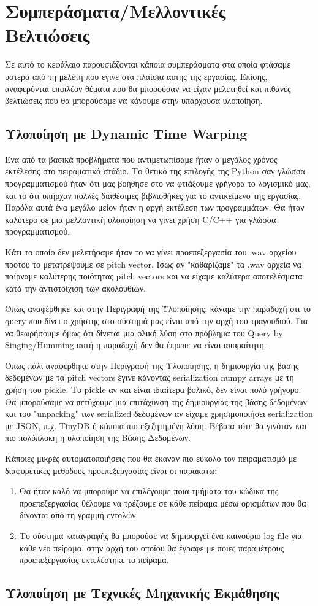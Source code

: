 \section{Συμπεράσματα/Μελλοντικές Βελτιώσεις}
Σε αυτό το κεφάλαιο παρουσιάζονται κάποια συμπεράσματα στα οποία φτάσαμε ύστερα από τη μελέτη που έγινε στα
πλαίσια αυτής της εργασίας. Επίσης, αναφερόνται επιπλέον θέματα που θα μπορούσαν να είχαν μελετηθεί 
και πιθανές βελτιώσεις που θα μπορούσαμε να κάνουμε στην υπάρχουσα υλοποίηση.

\subsection{Υλοποίηση με Dynamic Time Warping}
Ένα από τα βασικά προβλήματα που αντιμετωπίσαμε ήταν ο μεγάλος χρόνος εκτέλεσης στο πειραματικό στάδιο. Το θετικό της επιλογής της Python σαν γλώσσα προγραμματισμού ήταν ότι μας βοήθησε στο να φτιάξουμε γρήγορα το λογισμικό μας, και το ότι υπήρχαν πολλές διαθέσιμες βιβλιοθήκες για το αντικείμενο της εργασίας. Παρόλα αυτά ένα μεγάλο μείον ήταν η αργή εκτέλεση των προγραμμάτων. Θα ήταν καλύτερο σε μια μελλοντική υλοποίηση να γίνει χρήση C/C++ για γλώσσα προγραμματισμού.
  
Κάτι το οποίο δεν μελετήσαμε ήταν το να γίνει προεπεξεργασία του .wav αρχείου προτού το μετατρέψουμε σε pitch vector. Ίσως αν "καθαρίζαμε" τα .wav αρχεία να παίρναμε καλύτερης ποιότητας pitch vectors και να είχαμε καλύτερα αποτελέσματα κατά την αντιστοίχιση των ακολουθιών. 

Όπως αναφέρθηκε και στην Περιγραφή της Υλοποίησης, κάναμε την παραδοχή οτι το query που δίνει ο χρήστης στο σύστημά μας είναι από την αρχή του τραγουδιού. Για να θεωρήσουμε όμως ότι δίνεται μια ολική λύση στο πρόβλημα του Query by Singing/Humming αυτή η παραδοχή δεν θα έπρεπε να είναι απαραίτητη.

Όπως πάλι αναφέρθηκε στην Περιγραφή της Υλοποίησης, η δημιουργία της βάσης δεδομένων με τα pitch vectors έγινε κάνοντας serialization numpy arrays με τη χρήση του pickle. Το pickle αν και είναι ιδιαίτερα βολικό, δεν είναι πολύ γρήγορο. Θα μπορούσαμε να πετύχουμε μια επιτάχυνση της δημιουργίας της βάσης δεδομένων και του "unpacking" των serialized δεδομένων αν είχαμε χρησιμοποιήσει serialization με JSON, π.χ. TinyDB \cite{tinydb} ή κάποια πιο εξεζητημένη λύση. Βέβαια τότε θα γινόταν και πιο πολύπλοκη η υλοποίηση της Βάσης Δεδομένων.

Κάποιες μικρές αυτοματοποιήσεις που θα έκαναν πιο εύκολο τον πειραματισμό με διαφορετικές μεθόδους προεπεξεργασίας είναι οι παρακάτω:
\begin{enumerate}
	\item Θα ήταν καλό να μπορούμε να επιλέγουμε ποια τμήματα του κώδικα της προεπεξεργασίας θέλουμε να τρέξουμε σε κάθε πείραμα μέσω ορισμάτων που θα δίνονται από τη γραμμή εντολών.
 	\item Το σύστημα καταγραφής θα μπορούσε να δημιουργεί ένα καινούριο log file για κάθε νέο πείραμα, στην αρχή του οποίου θα έγραφε με ποιες παραμέτρους προεπεξεργασίας εκτελέστηκε το πείραμα. 
\end{enumerate} 

\subsection{Υλοποίηση με Τεχνικές Μηχανικής Εκμάθησης}